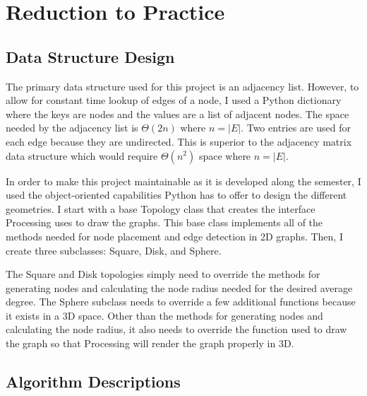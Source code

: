 \documentclass{article}
\begin{document}
\section{Reduction to Practice}

    \subsection{Data Structure Design}
    The primary data structure used for this project is an adjacency list. However, to allow for constant time lookup of edges of a node, I used a Python dictionary where the keys are nodes and the values are a list of adjacent nodes. The space needed by the adjacency list is $\Theta(2n)$ where $n = |E|$. Two entries are used for each edge because they are undirected. This is superior to the adjacency matrix data structure which would require $\Theta(n^2)$ space where $n = |E|$.
    \par
    In order to make this project maintainable as it is developed along the semester, I used the object-oriented capabilities Python has to offer to design the different geometries. I start with a base Topology class that creates the interface Processing uses to draw the graphs. This base class implements all of the methods needed for node placement and edge detection in 2D graphs. Then, I create three subclasses: Square, Disk, and Sphere.
    \par
    The Square and Disk topologies simply need to override the methods for generating nodes and calculating the node radius needed for the desired average degree. The Sphere subclass needs to override a few additional functions because it exists in a 3D space. Other than the methods for generating nodes and calculating the node radius, it also needs to override the function used to draw the graph so that Processing will render the graph properly in 3D.

    \subsection{Algorithm Descriptions}
\end{document}
